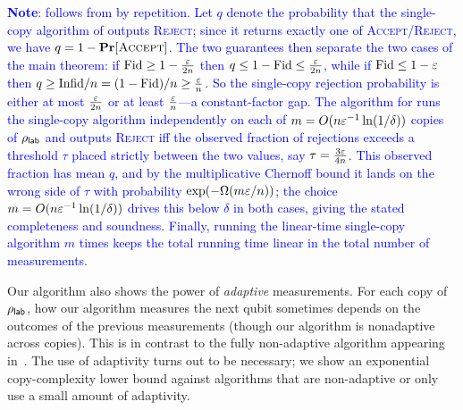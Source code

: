 \textcolor{blue}{\textbf{Note}:  follows from  by repetition. Let $q$ denote the probability that the single-copy algorithm of  outputs \textsc{Reject}; since it returns exactly one of \textsc{Accept}/\textsc{Reject}, we have $q=1-\Pr[\textsc{Accept}]$. The two guarantees then separate the two cases of the main theorem: if $\text{Fid}\geq 1-\tfrac{\eps}{2n}$ then $q\leq 1-\text{Fid}\leq\tfrac{\eps}{2n}$, while if $\text{Fid}\leq 1-\eps$ then $q\geq\text{Infid}/n=(1-\text{Fid})/n\geq\tfrac{\eps}{n}$. So the single-copy rejection probability is either at most $\tfrac{\eps}{2n}$ or at least $\tfrac{\eps}{n}$---a constant-factor gap. The algorithm for  runs the single-copy algorithm independently on each of $m=O(n\eps^{-1}\ln(1/\delta))$ copies of $\rho_{\lab}$ and outputs \textsc{Reject} iff the observed fraction of rejections exceeds a threshold $\tau$ placed strictly between the two values, say $\tau=\tfrac{3\eps}{4n}$. This observed fraction has mean $q$, and by the multiplicative Chernoff bound it lands on the wrong side of $\tau$ with probability $\exp(-\Omega(m\eps/n))$; the choice $m=O(n\eps^{-1}\ln(1/\delta))$ drives this below $\delta$ in both cases, giving the stated completeness and soundness. Finally, running the linear-time single-copy algorithm $m$ times keeps the total running time linear in the total number of measurements.}

Our algorithm also shows the power of \emph{adaptive} measurements.  For each copy of $\rho_{\lab}$, how our algorithm measures the next qubit sometimes depends on the outcomes of the previous measurements (though our algorithm is nonadaptive across copies).  This is in contrast to the fully non-adaptive algorithm appearing in~\cite{huang2024certifying}. %
The use of adaptivity turns out to be necessary; we show an exponential copy-complexity lower bound against algorithms that are non-adaptive or only use a small amount of adaptivity.

